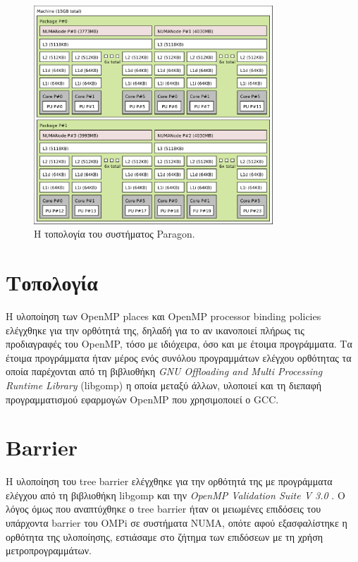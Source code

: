\begin{figure}[t]
	\centering
	\includegraphics[width=0.8\textwidth]{Figures/paragon-topo.pdf}
	\linebreak
	\caption{Η τοπολογία του συστήματος Paragon.}
	\label{fig:paragon-topo}
\end{figure}


\section{Τοπολογία}
Η υλοποίηση των OpenMP places και OpenMP processor binding policies ελέγχθηκε για την ορθότητά της, δηλαδή  για το αν ικανοποιεί πλήρως τις προδιαγραφές του OpenMP, τόσο με ιδιόχειρα, όσο και με έτοιμα προγράμματα.   Τα έτοιμα προγράμματα ήταν μέρος ενός συνόλου προγραμμάτων ελέγχου ορθότητας τα οποία παρέχονται από τη βιβλιοθήκη \textit{GNU Offloading and Multi Processing Runtime Library} (libgomp) η οποία μεταξύ άλλων, υλοποιεί και τη διεπαφή προγραμματισμού εφαρμογών OpenMP που χρησιμοποιεί ο GCC.


\section{Barrier}
\label{sec:exp-barrier}
Η υλοποίηση του tree barrier ελέγχθηκε για την ορθότητά της με προγράμματα ελέγχου από τη βιβλιοθήκη libgomp και την \textit{OpenMP Validation Suite V 3.0} \cite{wang2012openmp, ompvalsuite3}. Ο λόγος όμως που αναπτύχθηκε ο tree barrier ήταν οι μειωμένες επιδόσεις του υπάρχοντα barrier του OMPi σε συστήματα NUMA, οπότε αφού εξασφαλίστηκε η ορθότητα της υλοποίησης, εστιάσαμε στο ζήτημα των επιδόσεων με τη χρήση μετροπρογραμμάτων.

